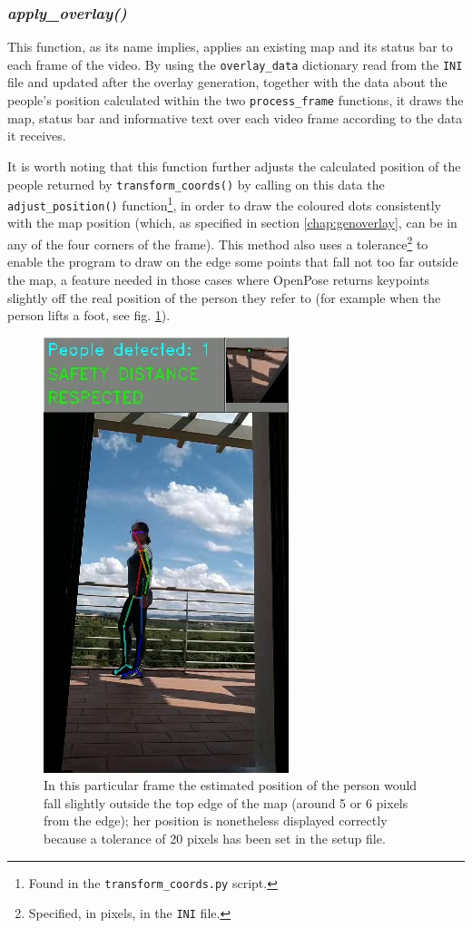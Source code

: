 \documentclass[12pt]{article}
\begin{document}
\subsubsection{\textit{apply\_overlay()}}
\label{chap:apploverlay}
This function, as its name implies, applies an existing map and its status bar to each frame of the video. By using the \lstinline{overlay_data} dictionary read from the \lstinline{INI} file and updated after the overlay generation, together with the data about the people’s position calculated within the two \lstinline{process_frame} functions, it draws the map, status bar and informative text over each video frame according to the data it receives.

It is worth noting that this function further adjusts the calculated position of the people returned by \lstinline{transform_coords()} by calling on this data the \lstinline{adjust_position()} function\footnote{Found in the \lstinline{transform_coords.py} script.}, in order to draw the coloured dots consistently with the map position (which, as specified in section \ref{chap:genoverlay}, can be in any of the four corners of the frame). This method also uses a tolerance\footnote{Specified, in pixels, in the \lstinline{INI} file.} to enable the program to draw on the edge some points that fall not too far outside the map, a feature needed in those cases where OpenPose returns keypoints slightly off the real position of the person they refer to (for example when the person lifts a foot, see fig. \ref{fig:edge}).

\begin{figure}[H]
\begin{center}
    \includegraphics[height=0.55\linewidth]{img/edge.jpg}
\end{center}
   \caption{In this particular frame the estimated position of the person would fall slightly outside the top edge of the map (around 5 or 6 pixels from the edge); her position is nonetheless displayed correctly because a tolerance of 20 pixels has been set in the setup file.}
\label{fig:edge}
\end{figure}
\end{document}
